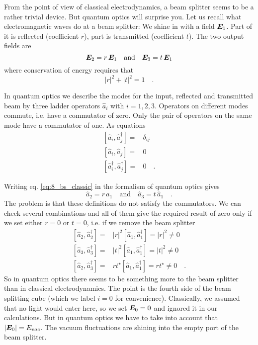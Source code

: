 From the point of view of classical electrodynamics, a beam splitter seems to be a rather trivial device. But quantum optics will surprise you. Let us recall what electromagnetic waves do at a beam splitter: We shine in with a field $\boldsymbol{E}_1$. Part of it is reflected (coefficient $r$), part is transmitted (coefficient $t$). The two output fields are
\begin{equation}
    \boldsymbol{E}_2 = r \, \boldsymbol{E}_1 \quad \text{and} \quad  \boldsymbol{E}_3 = t \, \boldsymbol{E}_1 \label{eq:8_bs_classic}
\end{equation}
where conservation of energy requires that 
\begin{equation}
    |r|^2 + |t|^2 = 1 \quad .
\end{equation}


In quantum optics we describe the modes for the input, reflected and transmitted beam by three ladder operators $\hat{a}_i$ with $i = 1,2,3$. Operators on different modes commute, i.e. have a commutator of zero. Only the pair of operators on the same mode have a commutator of one. As equations
\begin{align}
    \left[ \hat{a}_i, \hat{a}_j^\dagger  \right] = &  \delta_{ij} \\
    \left[ \hat{a}_i, \hat{a}_j  \right] = &  0 \\
    \left[ \hat{a}^\dagger_i, \hat{a}^\dagger_j  \right] = &  0  \quad .
\end{align}

Writing eq. \ref{eq:8_bs_classic} in the formalism of quantum optics gives
\begin{equation}
    \hat{a}_2 = r \, \hat{a}_1 \quad \text{and} \quad  \hat{a}_3 = t \, \hat{a}_1  \quad . \label{eq:8_bs_QO1}
\end{equation}
The problem is that these definitions do not satisfy the commutators. We can check several combinations and all of them give the required result of zero only if we set either $r=0$ or $t=0$, i.e. if we remove the beam splitter
\begin{align}
    \left[ \hat{a}_2, \hat{a}_2^\dagger  \right] = &  |r|^2 \left[ \hat{a}_1, \hat{a}_1^\dagger  \right] =  |r|^2  \neq 0 \\
    \left[ \hat{a}_3, \hat{a}_3^\dagger  \right] = &  |t|^2 \left[ \hat{a}_1, \hat{a}_1^\dagger  \right] =  |t|^2  \neq 0 \\
    \left[ \hat{a}_2, \hat{a}_3^\dagger  \right] = &  rt^\star \left[ \hat{a}_1, \hat{a}_1^\dagger  \right] =   rt^\star  \neq 0  \quad .
\end{align}
So in quantum optics there seems to be something more to the beam splitter than in classical electrodynamics. The point is the fourth side of the beam splitting cube (which we label $i=0$ for convenience). Classically, we assumed that no light would enter here, so we set $\boldsymbol{E}_0 = 0$ and ignored it in our calculations. But in quantum optics we have to take into account that $|\boldsymbol{E}_0| = E_{vac}$. The vacuum fluctuations are shining into the empty port of the beam splitter.

